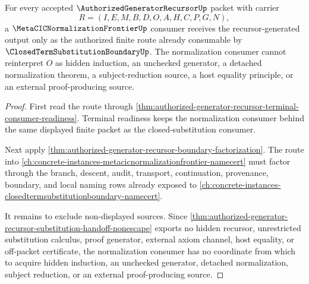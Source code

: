 \begin{theorem}
\label{thm:authorized-generator-recursor-normalization-consumer-nonescape}
For every accepted $\AuthorizedGeneratorRecursorUp$ packet with carrier
$$
R=(I,E,M,B,D,O,A,H,C,P,G,N),
$$
a $\MetaCICNormalizationFrontierUp$ consumer receives the recursor-generated output only as the authorized finite route already consumable by $\ClosedTermSubstitutionBoundaryUp$. The normalization consumer cannot reinterpret $O$ as hidden induction, an unchecked generator, a detached normalization theorem, a subject-reduction source, a host equality principle, or an external proof-producing source.
\end{theorem}
\begin{proof}
First read the route through \autoref{thm:authorized-generator-recursor-terminal-consumer-readiness}. Terminal readiness keeps the normalization consumer behind the same displayed finite packet as the closed-substitution consumer.

Next apply \autoref{thm:authorized-generator-recursor-boundary-factorization}. The route into \autoref{ch:concrete-instances-metacicnormalizationfrontier-namecert} must factor through the branch, descent, audit, transport, continuation, provenance, boundary, and local naming rows already exposed to \autoref{ch:concrete-instances-closedtermsubstitutionboundary-namecert}.

It remains to exclude non-displayed sources. Since \autoref{thm:authorized-generator-recursor-substitution-handoff-nonescape} exports no hidden recursor, unrestricted substitution calculus, proof generator, external axiom channel, host equality, or off-packet certificate, the normalization consumer has no coordinate from which to acquire hidden induction, an unchecked generator, detached normalization, subject reduction, or an external proof-producing source.
\end{proof}

